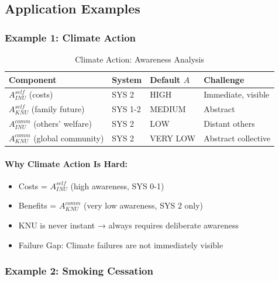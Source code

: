 \subsection{Application Examples}
\label{subsec:awareness-applications}

\subsubsection{Example 1: Climate Action}

\begin{table}[htbp]
\centering
\caption{Climate Action: Awareness Analysis}
\label{tab:climate-awareness}
\renewcommand{\arraystretch}{1.3}
\begin{tabular}{@{}llll@{}}
\toprule
\textbf{Component} & \textbf{System} & \textbf{Default $A$} & \textbf{Challenge} \\
\midrule
$A^{self}_{INU}$ (costs) & SYS 2 & HIGH & Immediate, visible \\
$A^{self}_{KNU}$ (family future) & SYS 1-2 & MEDIUM & Abstract \\
$A^{comm}_{INU}$ (others' welfare) & SYS 2 & LOW & Distant others \\
$A^{comm}_{KNU}$ (global community) & SYS 2 & VERY LOW & Abstract collective \\
\bottomrule
\end{tabular}
\end{table}

\paragraph{Why Climate Action Is Hard:}
\begin{itemize}
\item Costs = $A^{self}_{INU}$ (high awareness, SYS 0-1)
\item Benefits = $A^{comm}_{KNU}$ (very low awareness, SYS 2 only)
\item KNU is never instant → always requires deliberate awareness
\item Failure Gap: Climate failures are not immediately visible
\end{itemize}

\subsubsection{Example 2: Smoking Cessation}


